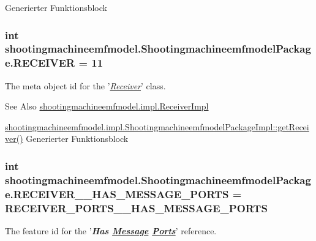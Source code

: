 Generierter Funktionsblock  \hypertarget{interfaceshootingmachineemfmodel_1_1_shootingmachineemfmodel_package_a4bedda5960870baa89368b22282164bc}{
\subsubsection[{R\-E\-C\-E\-I\-V\-E\-R}]{\setlength{\rightskip}{0pt plus 5cm}int shootingmachineemfmodel.\-Shootingmachineemfmodel\-Package.\-R\-E\-C\-E\-I\-V\-E\-R = 11}}\label{interfaceshootingmachineemfmodel_1_1_shootingmachineemfmodel_package_a4bedda5960870baa89368b22282164bc}
The meta object id for the '\hyperlink{classshootingmachineemfmodel_1_1impl_1_1_receiver_impl}{{\itshape Receiver}}' class.

\begin{DoxySeeAlso}{See Also}
\hyperlink{classshootingmachineemfmodel_1_1impl_1_1_receiver_impl}{shootingmachineemfmodel.\-impl.\-Receiver\-Impl} 

\hyperlink{classshootingmachineemfmodel_1_1impl_1_1_shootingmachineemfmodel_package_impl_a3a1f1115e25ffadf1e798560628d6535}{shootingmachineemfmodel.\-impl.\-Shootingmachineemfmodel\-Package\-Impl\-::get\-Receiver()} Generierter Funktionsblock 
\end{DoxySeeAlso}
\hypertarget{interfaceshootingmachineemfmodel_1_1_shootingmachineemfmodel_package_aab4c18e20b6251271bb3976894abd298}{
\subsubsection[{R\-E\-C\-E\-I\-V\-E\-R\-\_\-\-\_\-\-H\-A\-S\-\_\-\-M\-E\-S\-S\-A\-G\-E\-\_\-\-P\-O\-R\-T\-S}]{\setlength{\rightskip}{0pt plus 5cm}int shootingmachineemfmodel.\-Shootingmachineemfmodel\-Package.\-R\-E\-C\-E\-I\-V\-E\-R\-\_\-\-\_\-\-H\-A\-S\-\_\-\-M\-E\-S\-S\-A\-G\-E\-\_\-\-P\-O\-R\-T\-S = {\bf R\-E\-C\-E\-I\-V\-E\-R\-\_\-\-P\-O\-R\-T\-S\-\_\-\-\_\-\-H\-A\-S\-\_\-\-M\-E\-S\-S\-A\-G\-E\-\_\-\-P\-O\-R\-T\-S}}}\label{interfaceshootingmachineemfmodel_1_1_shootingmachineemfmodel_package_aab4c18e20b6251271bb3976894abd298}
The feature id for the '{\itshape {\bfseries Has \hyperlink{interfaceshootingmachineemfmodel_1_1_message}{Message} \hyperlink{interfaceshootingmachineemfmodel_1_1_ports}{Ports}}}' reference.

